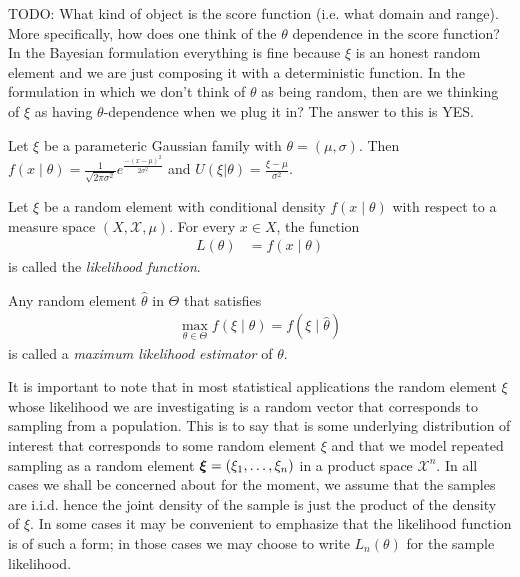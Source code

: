 TODO: What kind of object is the score function (i.e. what domain and
range).  More specifically, how does one think of the $\theta$ dependence in the score
function?  In the Bayesian formulation everything is fine because
$\xi$ is an honest random element and we are just composing it with a
deterministic function.  In the formulation in which we don't think of
$\theta$ as being random, then are we thinking of $\xi$ as having
$\theta$-dependence when we plug it in?  The answer to this is YES. 

\begin{examp}Let $\xi$ be a parameteric Gaussian family with
  $\theta=(\mu, \sigma)$.  Then $f(x \mid \theta) =
  \frac{1}{\sqrt{2\pi\sigma^2}} e^{\frac{-(x-\mu)^2}{2\sigma^2}}$ and
  $U(\xi | \theta) = \frac{\xi - \mu}{\sigma^2}$.
\end{examp}

\begin{defn}Let $\xi$ be a random element with conditional density
  $f(x \mid \theta)$ with respect to a measure space $(X,
  \mathcal{X}, \mu)$.  For every $x \in X$, the function 
\begin{align*}
L(\theta) &= f(x \mid \theta)
\end{align*}
is called the \emph{likelihood function}.

Any random element $\hat{\theta}$ in $\Theta$ that satisfies
\begin{align*}
\max_{\theta \in \Theta} f(\xi \mid \theta) = f(\xi \mid \hat{\theta})
\end{align*}
is called a \emph{maximum likelihood estimator} of $\theta$.
\end{defn}

It is important to note that in most statistical applications the
random element $\xi$ whose likelihood we are investigating is a random
vector that corresponds to sampling from a population.  This is to say
that is some underlying distribution of interest that corresponds to
some random element $\xi$ and that we model repeated sampling as a
random element $\boldsymbol{\xi} = (\xi_1, \dotsc, \xi_n)$ in a product
space $\mathcal{X}^n$.  In all cases we shall be concerned about for
the moment, we assume that the samples are i.i.d. hence the joint
density of the sample is just the product of the density of $\xi$.  In
some cases it may be convenient to emphasize that the likelihood
function is of such a form; in those cases we may choose to write
$L_n(\theta)$ for the sample likelihood.

